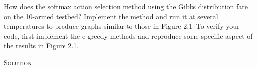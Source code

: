 \documentclass{article}
\begin{document}
How does the softmax action selection method using 
the Gibbs distribution fare on the 10-armed testbed? Implement the method and run 
it at several temperatures to produce graphs similar to those in Figure 2.1. To verify 
your code, first implement the e-greedy methods and reproduce some specific aspect 
of the results in Figure 2.1.

\textsc{Solution} 
\end{document}
